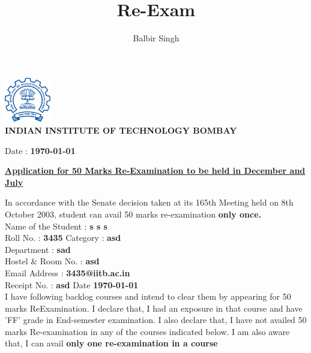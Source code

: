 \documentclass[12pt]{article}
\title{Re-Exam}
\author{Balbir Singh}
\begin{document}
\begin{center}
\includegraphics[width=0.15\textwidth]{logo.png}\\
    \large{\textbf{INDIAN INSTITUTE OF TECHNOLOGY BOMBAY}}
\end{center}

  
\begin{flushright}
    Date : \textbf{\today}
\end{flushright}          


\begin{center}    \underline{\textbf{Application for 50 Marks Re-Examination to be held in December and July}}
\end{center}
\vspace{0.4cm}
\hspace{4cm}
In accordance with the Senate decision taken at its 165th Meeting held on 8th October 2003,
student can avail 50 marks re-examination \textbf{only once.}\vspace{0.5cm}\\
Name of the Student : \textbf{\large{s s s}}\\
Roll No. : \textbf{\large{3435}}    Category : \textbf{\large{asd}}\\
Department : \textbf{\large{sad}}\\
Hostel & Room No. : \textbf{\large{asd}}\\
Email Address : \textbf{\large{3435@iitb.ac.in}}\\
Receipt No. : \textbf{\large{asd}}  Date \textbf{\today}
\vspace{0.5cm}\\

\hspace{1.2cm} I have following backlog courses and intend to clear them by appearing for 50 marks ReExamination. I declare that, I had an exposure in that course and have 'FF' grade in End-semester
examination. I also declare that, I have not availed 50 marks Re-examination in any of the courses
indicated below. I am also aware that, I can avail \textbf{only one re-examination in a course}
\end{document}

